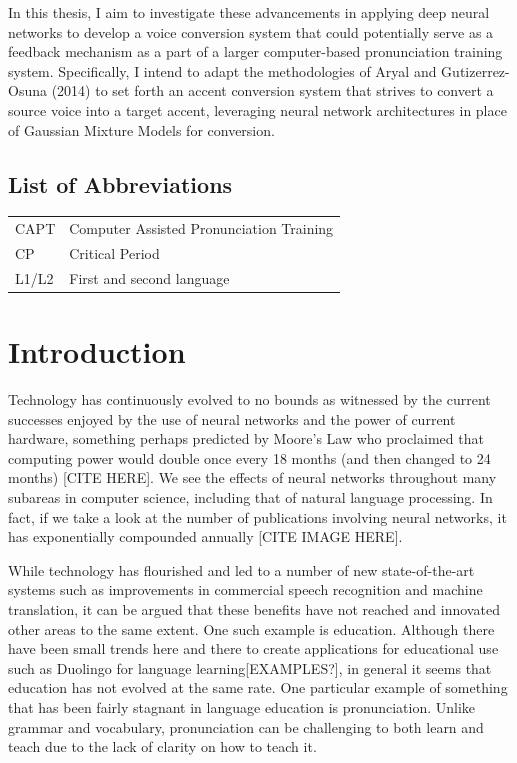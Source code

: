 \documentclass
[
    a4paper,
    twoside,
    12pt
]
{report}
\begin{document}
In this thesis, I aim to investigate these advancements in applying deep
neural networks to develop a voice conversion system that could
potentially serve as a feedback mechanism as a part of a larger
computer-based pronunciation training system. Specifically, I intend to
adapt the methodologies of Aryal and Gutizerrez-Osuna (2014) to set
forth an accent conversion system that strives to convert a source voice
into a target accent, leveraging neural network architectures in place
of Gaussian Mixture Models for conversion.
\cleardoublepage
\tableofcontents
{}
\clearpage
\listoffigures
{}

\section*{List of Abbreviations}\begin{tabular}{ll}
    CAPT    & Computer Assisted Pronunciation Training \\
    CP      & Critical Period \\
    L1/L2    & First and second language \\
    
\end{tabular}

\clearpage
\cleardoublepage
{} \setcounter{page}{1}

\chapter{Introduction}

Technology has continuously evolved to no bounds as witnessed by the
current successes enjoyed by the use of neural networks and the power of
current hardware, something perhaps predicted by Moore's Law who
proclaimed that computing power would double once every 18 months (and
then changed to 24 months) {[}CITE HERE{]}. We see the effects of neural
networks throughout many subareas in computer science, including that of
natural language processing. In fact, if we take a look at the number of
publications involving neural networks, it has exponentially compounded
annually {[}CITE IMAGE HERE{]}.

While technology has flourished and led to a number of new
state-of-the-art systems such as improvements in commercial speech
recognition and machine translation, it can be argued that these
benefits have not reached and innovated other areas to the same extent.
One such example is education. Although there have been small trends
here and there to create applications for educational use such as
Duolingo for language learning{[}EXAMPLES?{]}, in general it seems that
education has not evolved at the same rate. One particular example of
something that has been fairly stagnant in language education is
pronunciation. Unlike grammar and vocabulary, pronunciation can be
challenging to both learn and teach due to the lack of clarity on how to
teach it.
\end{document}

